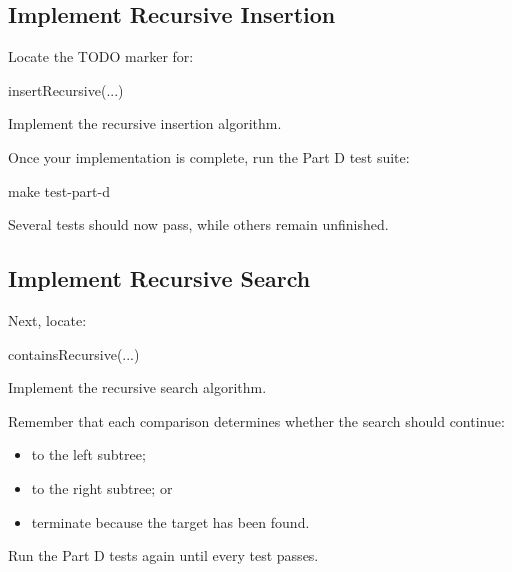 \documentclass{csc2059practical}
\begin{document}

\subsection{Implement Recursive Insertion}

Locate the TODO marker for:

\begin{terminal}
insertRecursive(...)
\end{terminal}

Implement the recursive insertion algorithm.

Once your implementation is complete, run the Part D test suite:

\begin{terminal}
make test-part-d
\end{terminal}

Several tests should now pass, while others remain unfinished.


\subsection{Implement Recursive Search}

Next, locate:

\begin{terminal}
containsRecursive(...)
\end{terminal}

Implement the recursive search algorithm.

Remember that each comparison determines whether the search should continue:

\begin{itemize}
    \item to the left subtree;
    \item to the right subtree; or
    \item terminate because the target has been found.
\end{itemize}

Run the Part D tests again until every test passes.

\end{document}
